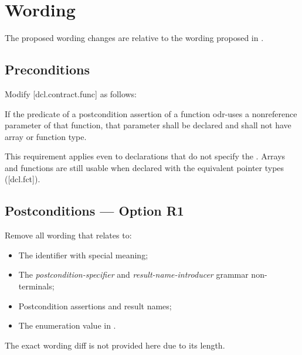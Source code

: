 \pagebreak

\section{Wording}

The proposed wording changes are relative to the wording proposed in \cite{P2900R10}.

\subsection*{Preconditions}

Modify [dcl.contract.func] as follows:

\begin{adjustwidth}{0.5cm}{0.5cm}
 If the predicate of a postcondition assertion of a function odr-uses a non\-reference parameter of that function, that parameter shall be declared  and shall not have array or function type. 
\begin{note}
This requirement applies even to declarations
that do not specify the . Arrays and functions are still usable when declared with the equivalent pointer types ([dcl.fct]).
\end{note}
\begin{example}
\tcode{[...]}
\end{example}
\end{adjustwidth}

\subsection*{Postconditions --- Option R1}

Remove all wording that relates to:
\begin{itemize}
\item The  identifier with special meaning;
\item The \emph{postcondition-specifier} and \emph{result-name-introducer} grammar non-terminals;
\item Postcondition assertions and result names;
\item The  enumeration value in .
\end{itemize}
The exact wording diff is not provided here due to its length.

